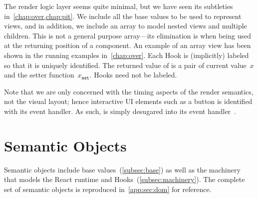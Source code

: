 The render logic layer seems quite minimal, but we have seen its subtleties in~\cref{chap:over,chap:pit}.
We include all the base values to be used to represent views, and in addition, we include an array to model nested views and multiple children.
This is not a general purpose array---its elimination is when being used at the returning position of a component.
An example of an array view has been shown in the running examples in~\cref{chap:over}.
Each  Hook is (implicitly) labeled so that it is uniquely identified.
The returned value of  is a pair of current value~$x$ and the setter function~$x_{\texttt{set}}$.
 Hooks need not be labeled.

Note that we are only concerned with the timing aspects of the render semantics, not the visual layout; hence interactive UI elements such as a button is identified with its event handler.
As such,  is simply desugared into its event handler~.


\section{Semantic Objects}\label{sec:dom}
Semantic objects include base values~(\cref{subsec:base}) as well as the machinery that models the React runtime and Hooks~(\cref{subsec:machinery}).
The complete set of semantic objects is reproduced in~\cref{app:sec:dom} for reference.

